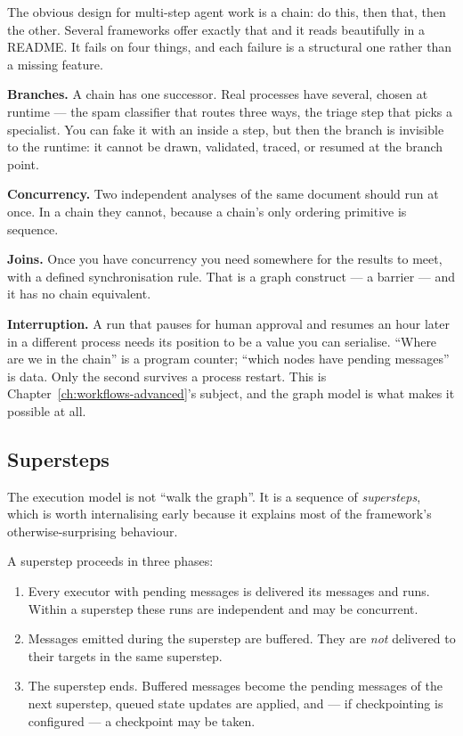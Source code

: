The obvious design for multi-step agent work is a chain: do this, then that, then
the other. Several frameworks offer exactly that and it reads beautifully in a
README. It fails on four things, and each failure is a structural one rather than
a missing feature.

\textbf{Branches.} A chain has one successor. Real processes have several, chosen
at runtime --- the spam classifier that routes three ways, the triage step that
picks a specialist. You can fake it with an  inside a step, but then the
branch is invisible to the runtime: it cannot be drawn, validated, traced, or
resumed at the branch point.

\textbf{Concurrency.} Two independent analyses of the same document should run at
once. In a chain they cannot, because a chain's only ordering primitive is
sequence.

\textbf{Joins.} Once you have concurrency you need somewhere for the results to
meet, with a defined synchronisation rule. That is a graph construct --- a
barrier --- and it has no chain equivalent.

\textbf{Interruption.} A run that pauses for human approval and resumes an hour
later in a different process needs its position to be a value you can serialise.
``Where are we in the chain'' is a program counter; ``which nodes have pending
messages'' is data. Only the second survives a process restart. This is
Chapter~\ref{ch:workflows-advanced}'s subject, and the graph model is what makes
it possible at all.

\subsection{Supersteps}
\label{sec:wf-supersteps}

The execution model is not ``walk the graph''. It is a sequence of
\emph{supersteps}, which is worth internalising early because it explains most of
the framework's otherwise-surprising behaviour.

A superstep proceeds in three phases:

\begin{enumerate}[leftmargin=1.4em]
\item Every executor with pending messages is delivered its messages and runs.
      Within a superstep these runs are independent and may be concurrent.
\item Messages emitted during the superstep are buffered. They are \emph{not}
      delivered to their targets in the same superstep.
\item The superstep ends. Buffered messages become the pending messages of the
      next superstep, queued state updates are applied, and --- if checkpointing
      is configured --- a checkpoint may be taken.
\end{enumerate}

